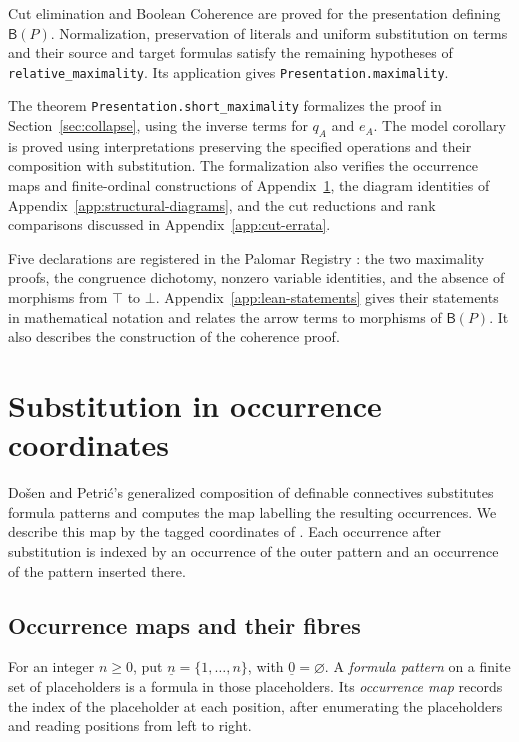\documentclass[11pt]{article}
\newcommand{\B}{\mathsf B}
\begin{document}
Cut elimination and Boolean Coherence are proved for the presentation
defining $\B(P)$. Normalization, preservation of literals and
uniform substitution on terms and their source and target formulas
satisfy the remaining hypotheses of \texttt{relative\_maximality}.
Its application gives \texttt{Presentation.maximality}.

The theorem \texttt{Presentation.short\_maximality} formalizes the proof
in Section~\ref{sec:collapse}, using the inverse terms for $q_A$ and $e_A$.
The model corollary is proved using interpretations preserving the
specified operations and their composition with substitution. The formalization
also verifies the occurrence maps and finite-ordinal constructions of
Appendix~\ref{app:substitution}, the diagram identities of
Appendix~\ref{app:structural-diagrams}, and the cut reductions and rank
comparisons discussed in Appendix~\ref{app:cut-errata}.

Five declarations are registered in the Palomar Registry
\cite{palomar-2026-10-30-000014-v3}:
the two maximality proofs, the congruence dichotomy, nonzero variable
identities, and the absence of morphisms from $\top$ to $\bot$.
Appendix~\ref{app:lean-statements} gives their statements in mathematical
notation and relates the arrow terms to morphisms of $\B(P)$.
It also describes the construction of the coherence proof.

\appendix
\section{Substitution in occurrence coordinates}\label{app:substitution}

Do\v{s}en and Petri\'c's generalized composition of definable
connectives \cite[\S2.5, pp.~45--46]{DP} substitutes formula
patterns and computes the map labelling the resulting occurrences.
We describe this map by the tagged coordinates of
\cite[\S\S9.2--9.3]{Notation}. Each occurrence after substitution
is indexed by an occurrence of the outer pattern and an occurrence
of the pattern inserted there.

\subsection{Occurrence maps and their fibres}\label{app:profiles}

For an integer $n\geq0$, put $\underline n=\{1,\ldots,n\}$, with
$\underline0=\varnothing$. A \emph{formula pattern} on a finite set
of placeholders is a formula in those placeholders. Its
\emph{occurrence map} records the index of the placeholder at each position,
after enumerating the placeholders and reading positions from left to right.
\end{document}
